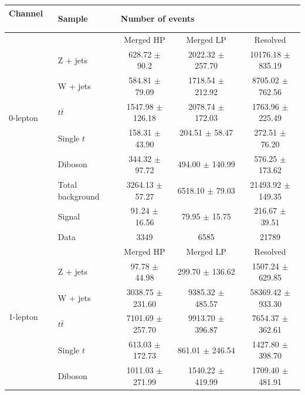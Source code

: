 \begin{table}[htbp]
\begin{center}
\begin{tabular}{| l | l | c | c | c |} \hline
Channel          　& Sample        & \multicolumn{3}{|l|}{Number of events} \\ \hline \hline
\multirow{7}{*}{0-lepton} &               & Merged HP  & Merged LP  & Resolved  \\ \cline{2-5}
                   & Z + jets     & 628.72 $\pm$ 90.2           & 2022.32 $\pm$ 257.70           & 10176.18 $\pm$ 835.19\\ 
                   & W + jets     & 584.81 $\pm$ 79.09          & 1718.54 $\pm$ 212.92           & 8705.02 $\pm$ 762.56\\  
                   & $t\bar{t}$   & 1547.98 $\pm$ 126.18        &  2078.74 $\pm$ 172.03       　　& 1763.96 $\pm$ 225.49\\ 
                   & Single $t$   & 158.31 $\pm$ 43.90          &  204.51 $\pm$ 58.47         　  & 272.51 $\pm$ 76.20  \\ 
                   & Diboson      &  344.32 $\pm$ 97.72         &  494.00 $\pm$ 140.99            & 576.25 $\pm$ 173.62\\ \cline{2-5}
                   & Total background    & 3264.13 $\pm$ 57.27  &  6518.10 $\pm$ 79.03            &21493.92 $\pm$ 149.35\\ \cline{2-5}
                   & Signal       & 91.24 $\pm$ 16.56           &   79.95 $\pm$ 15.75             & 216.67 $\pm$ 39.51\\ \cline{2-5}
                   & Data         & 3349           & 6585           &21789\\ \hline \hline
\multirow{7}{*}{1-lepton} &               & Merged HP  & Merged LP  & Resolved  \\ \cline{2-5}
                   & Z + jets     & 97.78 $\pm$ 44.98           & 299.70 $\pm$ 136.62           &1507.24 $\pm$ 629.85\\ 
                   & W + jets     & 3038.75 $\pm$ 231.60           &  9385.32 $\pm$ 485.57          &58369.42 $\pm$ 933.30\\  
                   & $t\bar{t}$   & 7101.69 $\pm$ 257.70           &  9913.70 $\pm$ 396.87          &7654.37 $\pm$ 362.61\\ 
                   & Single $t$         & 613.03 $\pm$ 172.73           &  861.01 $\pm$ 246.54          & 1427.80 $\pm$ 398.70\\ 
                   & Diboson      &  1011.03 $\pm$ 271.99          &   1540.22 $\pm$ 419.99         & 1709.40 $\pm$ 481.91\\ \cline{2-5}

\end{tabular}
\end{center}
\end{table}

